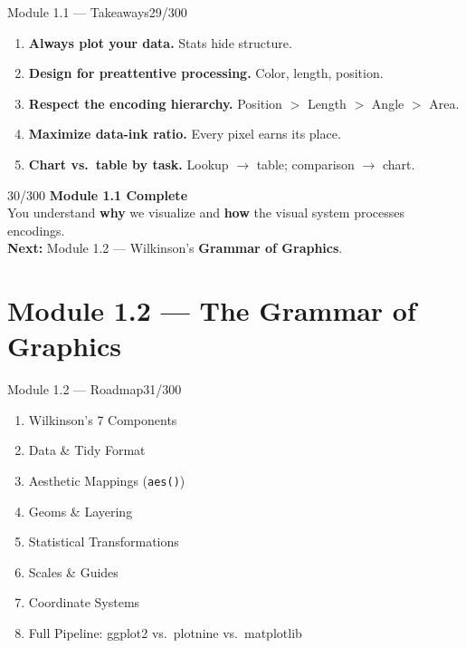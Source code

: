 \documentclass[10pt]{beamer}
\newcommand{\smark}[1]{\hfill{\scriptsize\color{codegray}#1}}
\begin{document}
\begin{frame}{Module 1.1 --- Takeaways}\smark{29/300}
\begin{enumerate}
    \item \textbf{Always plot your data.} Stats hide structure.
    \item \textbf{Design for preattentive processing.} Color, length, position.
    \item \textbf{Respect the encoding hierarchy.} Position $>$ Length $>$ Angle $>$ Area.
    \item \textbf{Maximize data-ink ratio.} Every pixel earns its place.
    \item \textbf{Chart vs.\ table by task.} Lookup $\to$ table; comparison $\to$ chart.
\end{enumerate}
\end{frame}

\begin{frame}{}\smark{30/300}
\centering\vspace{1.5cm}
{\Large\textbf{Module 1.1 Complete}}\\[0.5cm]
You understand \textbf{why} we visualize and \textbf{how} the visual system processes encodings.\\[0.5cm]
\textbf{Next:} Module 1.2 --- Wilkinson's \textbf{Grammar of Graphics}.
\end{frame}

\section{Module 1.2 --- The Grammar of Graphics}

\begin{frame}{Module 1.2 --- Roadmap}\smark{31/300}
\begin{enumerate}
    \item Wilkinson's 7 Components
    \item Data \& Tidy Format
    \item Aesthetic Mappings (\texttt{aes()})
    \item Geoms \& Layering
    \item Statistical Transformations
    \item Scales \& Guides
    \item Coordinate Systems
    \item Full Pipeline: ggplot2 vs.\ plotnine vs.\ matplotlib
\end{enumerate}
\end{frame}
\end{document}
